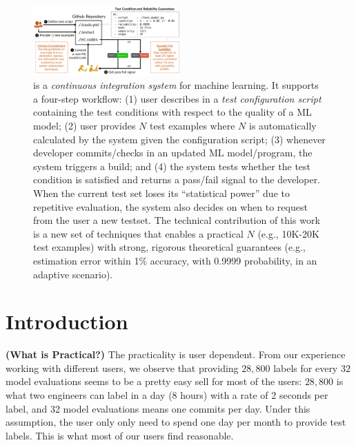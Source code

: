 \documentclass{article}
\begin{document}


\begin{figure}[t!]
\centering
\includegraphics[width=0.5\textwidth]{figures/CI.pdf}
\vspace{-2em}
\caption{\sys is a {\em continuous integration system}
for machine learning. It supports a four-step
workflow: (1) user describes in a {\em test configuration script} containing
the test conditions with respect to the quality
of a ML model; (2) user provides $N$ test
examples where $N$ is automatically calculated
by the system given the configuration script; (3) whenever developer commits/checks in 
an updated ML model/program, the
system triggers a build; and (4) the 
system tests whether the test condition is
satisfied and returns a pass/fail signal
to the developer. When the current test set
loses its ``statistical power'' due to repetitive evaluation, the system also decides
on when to request from 
the user a new testset. The technical contribution
of this work is a new set of techniques
that enables a practical $N$
(e.g., 10K-20K test examples) with
strong, rigorous theoretical guarantees
(e.g., estimation error within 1\% accuracy, with 0.9999 probability, in an adaptive 
scenario).}
\label{fig:e2e}
\end{figure}

\section{Introduction}

\vspace{1em}
\noindent
{\bf (What is Practical?)} The practicality 
is user dependent. From our experience working
with different users, we observe that 
providing $28,800$ labels for every $32$ model
evaluations seems to be a pretty easy sell 
for most of the users: $28,800$ is what two
engineers can label in a day (8 hours) with a
rate of 2 seconds per label, and 32 model evaluations
means one commits per day. Under this assumption, the user only
only need to spend one day per month to provide
test labels. This is what most of our users 
find reasonable.
\end{document}
